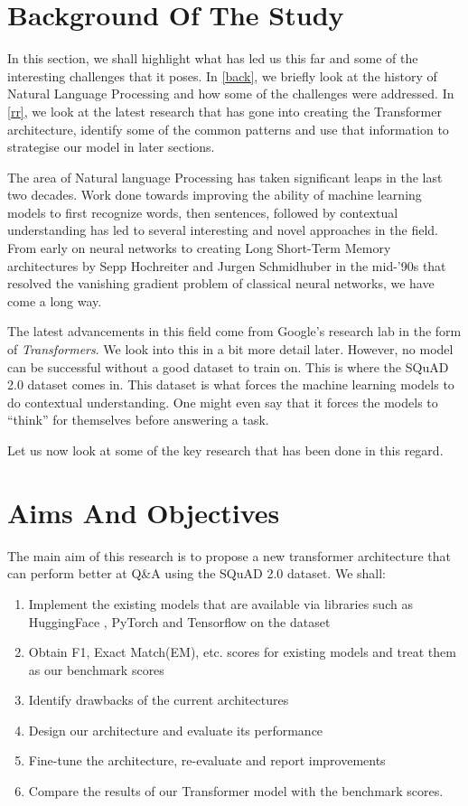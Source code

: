 \documentclass[12pt]{report}
\begin{document}
        \section{Background Of The Study}\label{c1background}
        	In this section, we shall highlight what has led us this far and some of the interesting challenges that it poses. In \ref{back}, we briefly look at the history of Natural Language Processing and how some of the challenges were addressed. In \ref{rr}, we look at the latest research that has gone into creating the Transformer architecture, identify some of the common patterns and use that information to strategise our model in later sections.

            The area of Natural language Processing has taken significant leaps in the last two decades. Work done towards improving the ability of machine learning models to first recognize words, then sentences, followed by contextual understanding has led to several interesting and novel approaches in the field. From early on neural networks to creating Long Short-Term Memory architectures \citep{originallstm} by Sepp Hochreiter and Jurgen Schmidhuber in the mid-'90s that resolved the vanishing gradient problem of classical neural networks, we have come a long way.

           The latest advancements in this field come from Google's research lab in the form of \textit{Transformers}. We look into this in a bit more detail later. However, no model can be successful without a good dataset to train on. This is where the SQuAD 2.0 dataset \citep{dataset} comes in. This dataset is what forces the machine learning models to do contextual understanding. One might even say that it forces the models to ``think'' for themselves before answering a task.

           Let us now look at some of the key research that has been done in this regard.


        \section{Aims And Objectives}\label{12}
        	The main aim of this research is to propose a new transformer architecture that can perform better at Q\&A using the SQuAD 2.0 dataset.
        We shall:
        \begin{enumerate}
        	\item Implement the existing models that are available via libraries such as HuggingFace \citep{hfTransformers}, PyTorch and Tensorflow on the dataset
        	\item Obtain F1, Exact Match(EM), etc. scores for existing models and treat them as our benchmark scores
        	\item Identify drawbacks of the current architectures
        	\item Design our architecture and evaluate its performance
        	\item Fine-tune the architecture, re-evaluate and report improvements
        	\item Compare the results of our Transformer model with the benchmark scores.
        \end{enumerate}
\end{document}
